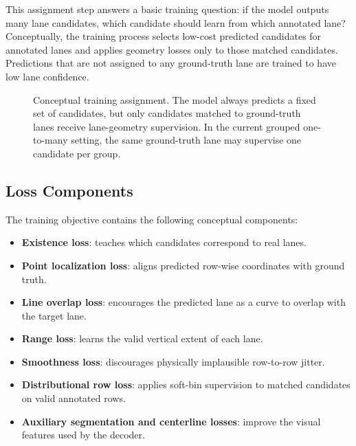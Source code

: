 \documentclass[conference]{IEEEtran}
\begin{document}
This assignment step answers a basic training question: if the model outputs many lane candidates, which candidate should learn from which annotated lane? Conceptually, the training process selects low-cost predicted candidates for annotated lanes and applies geometry losses only to those matched candidates. Predictions that are not assigned to any ground-truth lane are trained to have low lane confidence.

\begin{figure}[t]
\centering
{}
\caption{Conceptual training assignment. The model always predicts a fixed set of candidates, but only candidates matched to ground-truth lanes receive lane-geometry supervision. In the current grouped one-to-many setting, the same ground-truth lane may supervise one candidate per group.}
\label{fig:assignment}
\end{figure}

\subsection{Loss Components}

The training objective contains the following conceptual components:

\begin{itemize}
    \item \textbf{Existence loss}: teaches which candidates correspond to real lanes.
    \item \textbf{Point localization loss}: aligns predicted row-wise coordinates with ground truth.
    \item \textbf{Line overlap loss}: encourages the predicted lane as a curve to overlap with the target lane.
    \item \textbf{Range loss}: learns the valid vertical extent of each lane.
    \item \textbf{Smoothness loss}: discourages physically implausible row-to-row jitter.
    \item \textbf{Distributional row loss}: applies soft-bin supervision to matched candidates on valid annotated rows.
    \item \textbf{Auxiliary segmentation and centerline losses}: improve the visual features used by the decoder.
\end{itemize}
\end{document}
